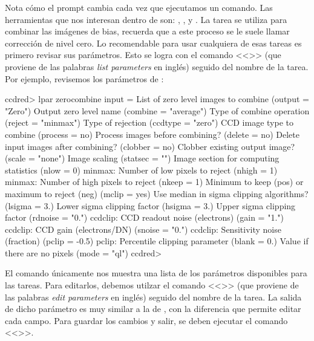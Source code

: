 Nota cómo el prompt cambia cada vez que ejecutamos un comando. Las herramientas que nos interesan dentro de  son: , ,  y . La tarea  se utiliza para combinar las imágenes de bias, recuerda que a este proceso se le suele llamar corrección de nivel cero. Lo recomendable para usar cualquiera de esas tareas es primero revisar sus parámetros. Esto se logra con el comando <<>> (que proviene de las palabras \emph{list parameters} en inglés) seguido del nombre de la tarea. Por ejemplo, revisemos los parámetros de :

\begin{bash}
ccdred> lpar zerocombine
        input =                 List of zero level images to combine
      (output = "Zero")         Output zero level name
     (combine = "average")      Type of combine operation
      (reject = "minmax")       Type of rejection
     (ccdtype = "zero")         CCD image type to combine
     (process = no)             Process images before combining?
      (delete = no)             Delete input images after combining?
     (clobber = no)             Clobber existing output image?
       (scale = "none")         Image scaling
     (statsec = "")             Image section for computing statistics
        (nlow = 0)              minmax: Number of low pixels to reject
       (nhigh = 1)              minmax: Number of high pixels to reject
       (nkeep = 1)              Minimum to keep (pos) or maximum to reject (neg)
       (mclip = yes)            Use median in sigma clipping algorithms?
      (lsigma = 3.)             Lower sigma clipping factor
      (hsigma = 3.)             Upper sigma clipping factor
     (rdnoise = "0.")           ccdclip: CCD readout noise (electrons)
        (gain = "1.")           ccdclip: CCD gain (electrons/DN)
      (snoise = "0.")           ccdclip: Sensitivity noise (fraction)
       (pclip = -0.5)           pclip: Percentile clipping parameter
       (blank = 0.)             Value if there are no pixels
        (mode = "ql")           
ccdred> 
\end{bash}

El comando  únicamente nos muestra una lista de los parámetros disponibles para las tareas. Para editarlos, debemos utilzar el comando <<>> (que proviene de las palabras \emph{edit parameters} en inglés) seguido del nombre de la tarea. La salida de dicho parámetro es muy similar a la de , con la diferencia que permite editar cada campo. Para guardar los cambios y salir, se deben ejecutar el comando <<>>.

